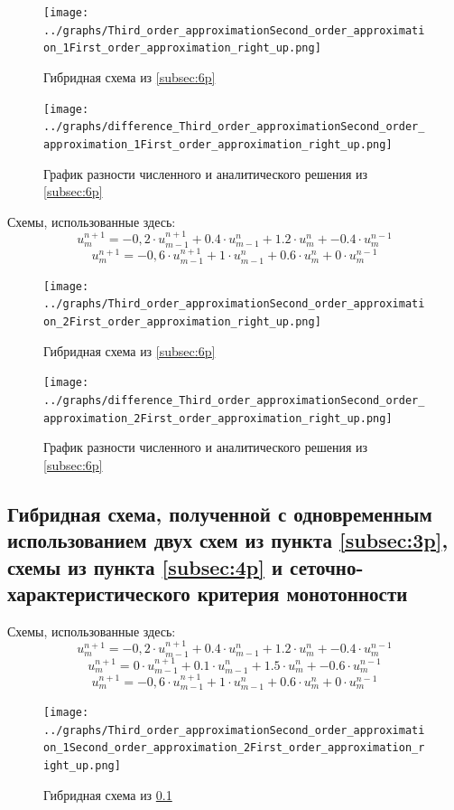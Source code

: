 \documentclass[a4paper, 12pt]{article} %
\begin{document}
\begin{figure}[h!]
    \centering
    \texttt{[image: ../graphs/Third\_order\_approximationSecond\_order\_approximation\_1First\_order\_approximation\_right\_up.png]}
    \caption{Гибридная схема из \ref{subsec:6p} \\ }
    \label{fig:vac}
\end{figure}

\begin{figure}[h!]
    \centering
    \texttt{[image: ../graphs/difference\_Third\_order\_approximationSecond\_order\_approximation\_1First\_order\_approximation\_right\_up.png]}
    \caption{График разности численного и аналитического решения из \ref{subsec:6p} \\ }
    \label{fig:vac}
\end{figure}

\newpage
Схемы, использованные здесь:
$$u^{n+1}_{m} = -0,2 \cdot u^{n+1}_{m-1} + 0.4 \cdot u^{n}_{m-1} + 1.2 \cdot u^{n}_{m} + -0.4 \cdot u^{n-1}_{m}$$
$$u^{n+1}_{m} = -0,6 \cdot u^{n+1}_{m-1} + 1 \cdot u^{n}_{m-1} + 0.6 \cdot u^{n}_{m} + 0 \cdot u^{n-1}_{m}$$
\begin{figure}[h!]
    \centering
    \texttt{[image: ../graphs/Third\_order\_approximationSecond\_order\_approximation\_2First\_order\_approximation\_right\_up.png]}
    \caption{Гибридная схема из \ref{subsec:6p}\\ }
    \label{fig:vac}
\end{figure}

\begin{figure}[h!]
    \centering
    \texttt{[image: ../graphs/difference\_Third\_order\_approximationSecond\_order\_approximation\_2First\_order\_approximation\_right\_up.png]}
    \caption{График разности численного и аналитического решения из \ref{subsec:6p} \\ }
    \label{fig:vac}
\end{figure}

\newpage
\subsection{Гибридная схема, полученной с одновременным использованием двух схем из пункта \ref{subsec:3p}, схемы из пункта \ref{subsec:4p} и сеточно-характеристического критерия монотонности}
\label{subsec:7p}
Схемы, использованные здесь:
$$u^{n+1}_{m} = -0,2 \cdot u^{n+1}_{m-1} + 0.4 \cdot u^{n}_{m-1} + 1.2 \cdot u^{n}_{m} + -0.4 \cdot u^{n-1}_{m}$$
$$u^{n+1}_{m} = 0 \cdot u^{n+1}_{m-1} + 0.1 \cdot u^{n}_{m-1} + 1.5 \cdot u^{n}_{m} + -0.6 \cdot u^{n-1}_{m}$$
$$u^{n+1}_{m} = -0,6 \cdot u^{n+1}_{m-1} + 1 \cdot u^{n}_{m-1} + 0.6 \cdot u^{n}_{m} + 0 \cdot u^{n-1}_{m}$$
\begin{figure}[h!]
    \centering
    \texttt{[image: ../graphs/Third\_order\_approximationSecond\_order\_approximation\_1Second\_order\_approximation\_2First\_order\_approximation\_right\_up.png]}
    \caption{Гибридная схема из \ref{subsec:7p}\\ }
    \label{fig:vac}
\end{figure}
\end{document}
